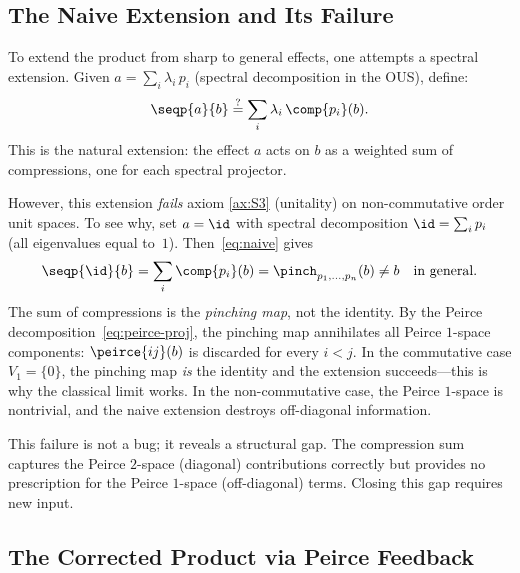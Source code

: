 \documentclass[11pt]{article}
\begin{document}
\subsection{The Naive Extension and Its Failure}
\label{sec:sp-naive}

To extend the product from sharp to general effects, one attempts a
spectral extension.  Given $a = \sum_{i} \lambda_{i}\, p_{i}$
(spectral decomposition in the OUS), define:
\begin{equation}\label{eq:naive}
  \seqp{a}{b} \stackrel{?}{=}
    \sum_{i} \lambda_{i}\, \comp{p_{i}}(b).
\end{equation}
This is the natural extension: the effect $a$ acts on $b$ as a
weighted sum of compressions, one for each spectral projector.

However, this extension \emph{fails} axiom \ref{ax:S3} (unitality)
on non-commutative order unit spaces.  To see why, set $a = \id$ with
spectral decomposition $\id = \sum_{i} p_{i}$ (all eigenvalues equal
to~$1$).  Then~\eqref{eq:naive} gives
\begin{equation}\label{eq:naive-failure}
  \seqp{\id}{b}
  = \sum_{i} \comp{p_{i}}(b)
  = \pinch_{p_{1}, \ldots, p_{n}}(b)
  \neq b
  \quad\text{in general.}
\end{equation}
The sum of compressions is the \emph{pinching map}, not the identity.
By the Peirce decomposition~\eqref{eq:peirce-proj}, the pinching map
annihilates all Peirce $1$-space components: $\peirce{ij}(b)$ is
discarded for every $i < j$.  In the commutative case
$V_{1} = \{0\}$, the pinching map \emph{is} the identity and the
extension succeeds---this is why the classical limit works.  In the
non-commutative case, the Peirce $1$-space is nontrivial, and the
naive extension destroys off-diagonal information.

This failure is not a bug; it reveals a structural gap.  The
compression sum captures the Peirce $2$-space (diagonal) contributions
correctly but provides no prescription for the Peirce $1$-space
(off-diagonal) terms.  Closing this gap requires new input.


\subsection{The Corrected Product via Peirce Feedback}
\label{sec:sp-corrected}
\end{document}
